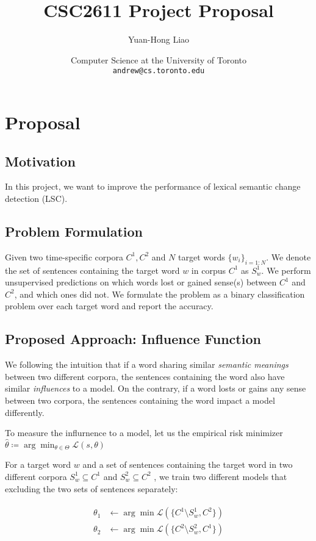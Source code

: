\documentclass[a4paper]{article}
\title{CSC2611 Project Proposal}
\author{Yuan-Hong Liao}
\date{
	Computer Science at the University of Toronto \\ \texttt{andrew@cs.toronto.edu}
}
\newcommand{\AL}[1]{{\color{blue}{[Andrew: #1]}}}
\theoremstyle{plain}
\theoremstyle{definition}
\begin{document}
\maketitle

\section{Proposal}

\subsection{Motivation}
\AL{Some overview.} In this project, we want to improve the performance of lexical semantic change detection (LSC).
\AL{Emphasize unsupervised}

\subsection{Problem Formulation}
Given two time-specific corpora $C^1, C^2$ and $N$ target words $\{w_i\}_{i=1:N}$.
We denote the set of sentences containing the target word $w$ in corpus $C^1$ as $S_w^1$.
We perform unsupervised predictions on which words lost or gained sense(s) between $C^1$ and $C^2$, and which ones did not.
We formulate the problem as a binary classification problem over each target word and report the accuracy.

\subsection{Proposed Approach: Influence Function}

We following the intuition that if a word sharing similar \textit{semantic meanings} between two different corpora, the sentences containing the word also have similar \textit{influences} to a model.
On the contrary, if a word losts or gains any sense between two corpora, the sentences containing the word impact a model differently.

To measure the influrnence to a model, let us the empirical risk minimizer $\hat{\theta} \coloneqq \arg\min_{\theta \in \Theta} \mathcal{L} (s, \theta) $

For a target word $w$ and a set of sentences containing the target word in two different corpora $S_w^1 \subseteq C^1$ and $S_w^2 \subseteq C^2$ , we train two different models that excluding the two sets of sentences separately:

\begin{align}
\begin{split}
	\theta_1 & \leftarrow \arg\min \mathcal{L}(\{C^1 \setminus S_w^1, C^2\}) \\
	\theta_2 & \leftarrow \arg\min \mathcal{L}(\{C^2 \setminus S_w^2, C^1\})
\end{split}
\end{align}
\end{document}
